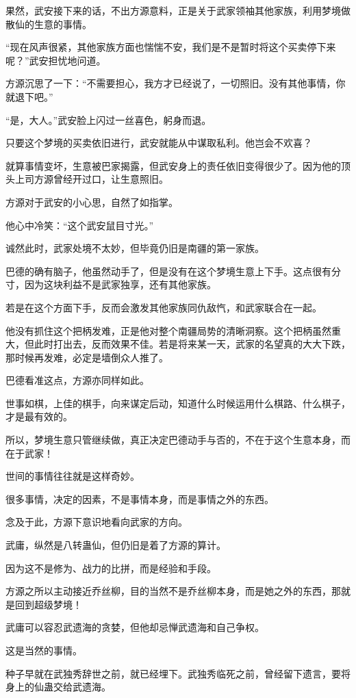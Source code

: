 \begin{this_body}
果然，武安接下来的话，不出方源意料，正是关于武家领袖其他家族，利用梦境做散仙的生意的事情。

“现在风声很紧，其他家族方面也惴惴不安，我们是不是暂时将这个买卖停下来呢？”武安担忧地问道。

方源沉思了一下：“不需要担心，我方才已经说了，一切照旧。没有其他事情，你就退下吧。”

“是，大人。”武安脸上闪过一丝喜色，躬身而退。

只要这个梦境的买卖依旧进行，武安就能从中谋取私利。他岂会不欢喜？

就算事情变坏，生意被巴家揭露，但武安身上的责任依旧变得很少了。因为他的顶头上司方源曾经开过口，让生意照旧。

方源对于武安的小心思，自然了如指掌。

他心中冷笑：“这个武安鼠目寸光。”

诚然此时，武家处境不太妙，但毕竟仍旧是南疆的第一家族。

巴德的确有脑子，他虽然动手了，但是没有在这个梦境生意上下手。这点很有分寸，因为这块利益不是武家独享，还有其他家族。

若是在这个方面下手，反而会激发其他家族同仇敌忾，和武家联合在一起。

他没有抓住这个把柄发难，正是他对整个南疆局势的清晰洞察。这个把柄虽然重大，但此时打出去，反而效果不佳。若是将来某一天，武家的名望真的大大下跌，那时候再发难，必定是墙倒众人推了。

巴德看准这点，方源亦同样如此。

世事如棋，上佳的棋手，向来谋定后动，知道什么时候运用什么棋路、什么棋子，才是最有效的。

所以，梦境生意只管继续做，真正决定巴德动手与否的，不在于这个生意本身，而在于武家！

世间的事情往往就是这样奇妙。

很多事情，决定的因素，不是事情本身，而是事情之外的东西。

念及于此，方源下意识地看向武家的方向。

武庸，纵然是八转蛊仙，但仍旧是着了方源的算计。

因为这不是修为、战力的比拼，而是经验和手段。

方源之所以主动接近乔丝柳，目的当然不是乔丝柳本身，而是她之外的东西，那就是回到超级梦境！

武庸可以容忍武遗海的贪婪，但他却忌惮武遗海和自己争权。

这是当然的事情。

种子早就在武独秀辞世之前，就已经埋下。武独秀临死之前，曾经留下遗言，要将身上的仙蛊交给武遗海。


\end{this_body}
